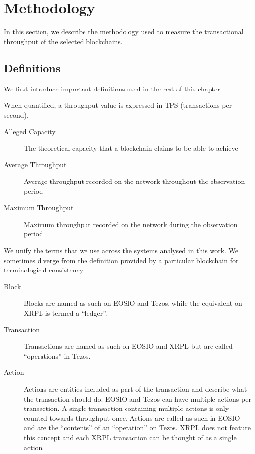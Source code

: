 
\section{Methodology}
\label{sec:4:methodology}
In this section, we describe the methodology used to measure the transactional throughput of the selected blockchains.

\subsection{Definitions}
We first introduce important definitions used in the rest of this chapter.

When quantified, a throughput value is expressed in TPS (transactions per second).
\begin{description}
	\item[Alleged Capacity] The theoretical capacity that a blockchain claims to be able to achieve
	\item[Average Throughput] Average throughput recorded on the network throughout the observation period
	\item[Maximum Throughput] Maximum throughput recorded on the network during the observation period
\end{description}

We unify the terms that we use across the systems analysed in this work.
We sometimes diverge from the definition provided by a particular blockchain for terminological consistency.

\begin{description}
	\item[Block] Blocks are named as such on EOSIO and Tezos, while the equivalent on XRPL is termed a ``ledger''.
	\item[Transaction] Transactions are named as such on EOSIO and XRPL but are called ``operations'' in Tezos.
	\item[Action] Actions are entities included as part of the transaction and describe what the transaction should do. EOSIO and Tezos can have multiple actions per transaction. A single transaction containing multiple actions is only counted towards throughput once.
		Actions are called as such in EOSIO and are the ``contents'' of an ``operation'' on Tezos. XRPL does not feature this concept and each XRPL transaction can be thought of as a single action.
\end{description}


